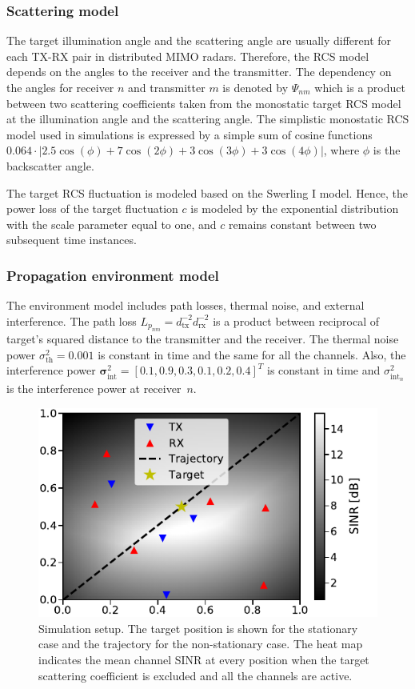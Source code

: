 \documentclass[english, 12pt, a4paper, elec, utf8, a-1b, online]{aaltothesis}
\numberwithin{equation}{section}
\newcommand{\abs}[1]{\lvert#1\rvert}
\newcommand{\thnoise}{\sigma^2_{\text{th}}}
\newcommand{\eintnoise}{\sigma^2_{\text{int}_{n}}}
\newcommand{\vintnoise}{\boldsymbol{\sigma}^2_{\text{int}}}
\newcommand{\epl}{L_{p_{nm}}}
\newcommand{\ercs}{\Psi_{nm}}
\begin{document}
\subsubsection{Scattering model}
\label{sec:sc_model}

The target illumination angle and the scattering angle are usually different for each TX-RX pair in distributed MIMO radars.
Therefore, the RCS model depends on the angles to the receiver and the transmitter.
The dependency on the angles for receiver $n$ and transmitter $m$ is denoted by $\ercs$ which is a product between two scattering coefficients taken from the monostatic target RCS model at the illumination angle and the scattering angle.
The simplistic monostatic RCS model used in simulations is expressed by a simple sum of cosine functions $0.064 \cdot \abs{2.5\cos(\phi) + 7\cos(2\phi) + 3\cos(3\phi) + 3\cos(4\phi)}$, where $\phi$ is the backscatter angle.

The target RCS fluctuation is modeled based on the Swerling I model.
Hence, the power loss of the target fluctuation $c$ is modeled by the exponential distribution with the scale parameter equal to one, and $c$ remains constant between two subsequent time instances.

\subsubsection{Propagation environment model}
\label{sec:env_model}

The environment model includes path losses, thermal noise, and external interference.
The path loss $\epl = d_\text{tx}^{-2} d_\text{rx}^{-2}$ is a product between
reciprocal of target's squared distance to the transmitter and the receiver.
The thermal noise power $\thnoise=0.001$ is constant in time and the same for all the channels.
Also, the interference power $\vintnoise=[0.1, 0.9, 0.3, 0.1, 0.2, 0.4]^T$ is constant in time and $\eintnoise$ is the interference power at receiver~$n$.

\begin{figure}[!tb]
    \centering
    \includegraphics[width=.6\textwidth]{figures/MAB/env.pdf}
    \caption{Simulation setup.
    The target position is shown for the stationary case and the trajectory for the non-stationary case. 
    The heat map indicates the mean channel SINR at every position when the target scattering coefficient is excluded and all the channels are active.}
    \label{fig:env}
\end{figure}
\end{document}
